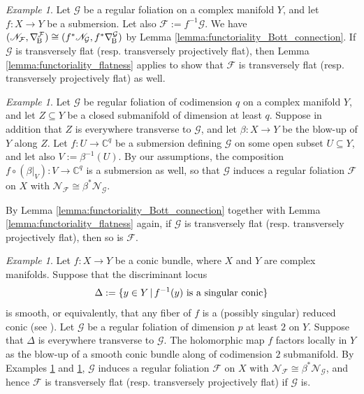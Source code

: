 \documentclass[english,10pt]{amsart}
\newcommand{\nablaBott}{\nabla_{\! \textup{B}}}
\newcommand{\cF}{\mathcal{F}}
\newcommand{\cG}{\mathcal{G}}
\newcommand{\sN}{\mathscr{N}}
\theoremstyle{definition}
\theoremstyle{remark}
\newtheorem{exmp}[thm]{Example}
\numberwithin{equation}{section}
\begin{document}
\begin{exmp}\label{example:submersion}
Let $\cG$ be a regular foliation on a complex manifold $Y$, and let $f \colon X \to Y$ be a submersion. Let also $\cF:=f^{-1}\cG$. We have $(\sN_\cF,\nablaBott^\cF) \cong (f^*\sN_\cG,f^*\nablaBott^\cG)$ by Lemma \ref{lemma:functoriality_Bott_connection}. If $\cG$ is transversely flat (resp. transversely projectively flat), then Lemma \ref{lemma:functoriality_flatness} applies to show that $\cF$ is transversely flat (resp. transversely projectively flat) as well. 
\end{exmp}

\begin{exmp}\label{example:blow_up}
Let $\cG$ be regular foliation of codimension $q$ on a complex manifold $Y$, and let $Z \subseteq Y$ be a closed submanifold of dimension at least $q$. Suppose in addition that $Z$ is everywhere transverse to $\cG$, and let $\beta\colon X \to Y$ be the blow-up of $Y$ along $Z$. Let $f \colon U \to \mathbb{C}^q$ be a submersion defining $\cG$ on some open subset $U \subseteq Y$, and let also $V:=\beta^{-1}(U)$. By our assumptions, the composition $f \circ (\beta|_V) \colon V \to \mathbb{C}^q$ is a submersion as well, so that $\cG$ induces a regular foliation $\cF$ on $X$ with $\sN_\cF \cong \beta^*\sN_\cG$. 

By Lemma \ref{lemma:functoriality_Bott_connection} together with Lemma \ref{lemma:functoriality_flatness} again, if $\cG$ is transversely flat (resp. transversely projectively flat), then so is $\cF$.
\end{exmp}

\begin{exmp}\label{example:conic_bundle}
Let $f \colon X \to Y$ be a conic bundle, where $X$ and $Y$ are complex manifolds. Suppose that the discriminant locus 
\[
\Delta:=\{y \in Y \,|\, f^{-1}(y) \textup{ is a singular conic}\}
\] 
is smooth, or equivalently, that any fiber of $f$ is a (possibly singular) reduced conic (see \cite[Lemma 4.7]{druel_bbcd2}). Let $\cG$ be a regular foliation of dimension $p$ at least $2$ on $Y$. Suppose that $\Delta$ is everywhere transverse to $\cG$. The holomorphic map $f$ factors locally in $Y$ as the blow-up of a smooth conic bundle along of codimension $2$ submanifold. By Examples \ref{example:submersion} and \ref{example:blow_up}, $\cG$ induces a regular foliation $\cF$ on $X$ with $\sN_\cF \cong \beta^*\sN_\cG$, and hence $\cF$ is transversely flat (resp. transversely projectively flat) if $\cG$ is. 
\end{exmp}
\end{document}
